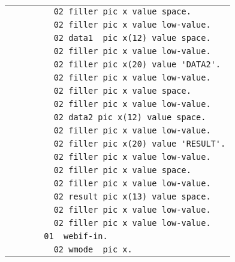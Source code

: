 {\begin{tabular}{|l|}
\vspace{-0.4em}\verb!         02 filler pic x value space.!\\
\vspace{-0.4em}\verb!         02 filler pic x value low-value.!\\
\vspace{-0.4em}\verb!         02 data1  pic x(12) value space.!\\
\vspace{-0.4em}\verb!         02 filler pic x value low-value.!\\
\vspace{-0.4em}\verb!         02 filler pic x(20) value 'DATA2'.!\\
\vspace{-0.4em}\verb!         02 filler pic x value low-value.!\\
\vspace{-0.4em}\verb!         02 filler pic x value space.!\\
\vspace{-0.4em}\verb!         02 filler pic x value low-value.!\\
\vspace{-0.4em}\verb!         02 data2 pic x(12) value space.!\\
\vspace{-0.4em}\verb!         02 filler pic x value low-value.!\\
\vspace{-0.4em}\verb!         02 filler pic x(20) value 'RESULT'.!\\
\vspace{-0.4em}\verb!         02 filler pic x value low-value.!\\
\vspace{-0.4em}\verb!         02 filler pic x value space.!\\
\vspace{-0.4em}\verb!         02 filler pic x value low-value.!\\
\vspace{-0.4em}\verb!         02 result pic x(13) value space.!\\
\vspace{-0.4em}\verb!         02 filler pic x value low-value.!\\
\vspace{-0.4em}\verb!         02 filler pic x value low-value.!\\
\vspace{-0.4em}\verb!       01  webif-in.!\\
\vspace{-0.4em}\verb!         02 wmode  pic x.!\\

\end{tabular}}
